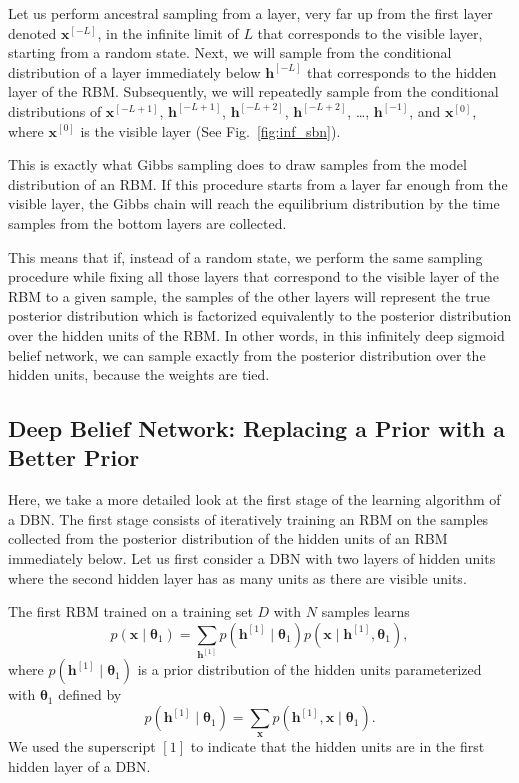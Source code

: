 \documentclass{now}
\newcommand{\qlay}[1]{\left[#1\right]}
\newcommand{\vect}[1]{\mathbf{#1}}
\newcommand{\vects}[1]{\boldsymbol{#1}}
\newcommand{\vh}[0]{\vect{h}}
\newcommand{\vx}[0]{\vect{x}}
\newcommand{\TT}[0]{{\vects{\theta}}}
\begin{document}
Let us perform ancestral sampling from a layer, very far up from the first layer
denoted $\vx^{\qlay{-L}}$, in the infinite limit of $L$ that corresponds to the
visible layer, starting from a random state.  Next, we will sample from the
conditional distribution of a layer immediately below $\vh^{\qlay{-L}}$ that
corresponds to the hidden layer of the RBM. Subsequently, we will repeatedly
sample from the conditional distributions of $\vx^{\qlay{-L+1}}$,
$\vh^{\qlay{-L+1}}$, $\vh^{\qlay{-L+2}}$, $\vh^{\qlay{-L+2}}$, \dots,
$\vh^{\qlay{-1}}$, and $\vx^{\qlay{0}}$, where $\vx^{\qlay{0}}$ is the visible
layer (See Fig.~\ref{fig:inf_sbn}). 

This is exactly what Gibbs sampling does to draw samples from the model
distribution of an RBM. If this procedure starts from a layer far enough from
the visible layer, the Gibbs chain will reach the equilibrium distribution by
the time samples from the bottom layers are collected. 

This means that if, instead of a random state, we perform the same sampling
procedure while fixing all those layers that correspond to the visible layer of
the RBM to a given sample, the samples of the other layers will represent the
true posterior distribution which is factorized equivalently to the posterior
distribution over the hidden units of the RBM. In other words, in this
infinitely deep sigmoid belief network, we can sample exactly from the
posterior distribution over the hidden units, because the weights are tied.

\subsection{Deep Belief Network: Replacing a Prior with a Better Prior}
\label{sec:dbn_rbm}

Here, we take a more detailed look at the first stage of the learning algorithm
of a DBN. The first stage consists of iteratively training an RBM on the
samples collected from the posterior distribution of the hidden units of an RBM
immediately below. Let us first consider a DBN with two layers of hidden units
where the second hidden layer has as many units as there are visible units.

The first RBM trained on a training set $D$ with $N$ samples learns
\[
p(\vx \mid \TT_1) = \sum_{\vh^{\qlay{1}}} p(\vh^{\qlay{1}}\mid \TT_1) p(\vx \mid
\vh^{\qlay{1}}, \TT_1),
\]
where $p(\vh^{\qlay{1}}\mid \TT_1)$ is a prior distribution of the hidden units
parameterized with $\TT_1$ defined by
\[
p(\vh^{\qlay{1}} \mid \TT_1) = \sum_{\vx} p(\vh^{\qlay{1}}, \vx \mid \TT_1).
\]
We used the superscript $\qlay{1}$ to indicate that the hidden units are in the
first hidden layer of a DBN.
\end{document}
